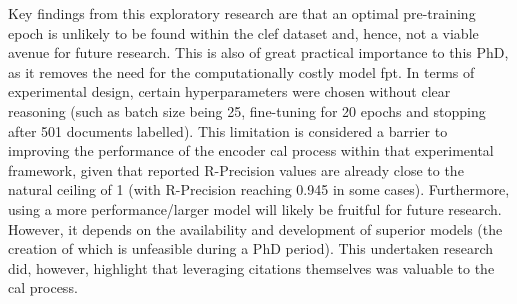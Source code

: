\documentclass[10pt,oneside]{book}
\begin{document}
Key findings from this exploratory research are that an optimal pre-training epoch is unlikely to be found within the \gls*{clef} dataset and, hence, not a viable avenue for future research. This is also of great practical importance to this PhD, as it removes the need for the computationally costly model \gls*{fpt}.  In terms of experimental design, certain hyperparameters were chosen without clear reasoning (such as batch size being 25, fine-tuning for 20 epochs and stopping after 501 documents labelled). This limitation is considered a barrier to improving the performance of the encoder \gls*{cal} process within that experimental framework, given that reported R-Precision values are already close to the natural ceiling of 1 (with R-Precision reaching 0.945 in some cases). Furthermore, using a more performance/larger model will likely be fruitful for future research. However, it depends on the availability and development of superior models (the creation of which is unfeasible during a PhD period). This undertaken research did, however, highlight that leveraging citations themselves was valuable to the \gls*{cal} process. 
\end{document}

